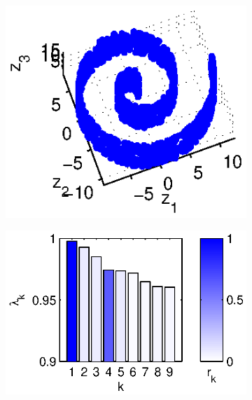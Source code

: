 \begin{figure}[!t]
\begin{subfigure}{0.2\textwidth}
\centering
\includegraphics[width=\textwidth]{swissroll2}
\caption{}
\label{subfig:swissroll2}
\end{subfigure}%
%
\begin{subfigure}{0.25\textwidth}
\centering
\includegraphics[width=\textwidth]{swissroll2_evals}
\caption{}
\label{subfig:swissroll2_evals}
\end{subfigure}
%
\begin{subfigure}{0.25\textwidth}
\centering

\end{subfigure}
\end{figure}
